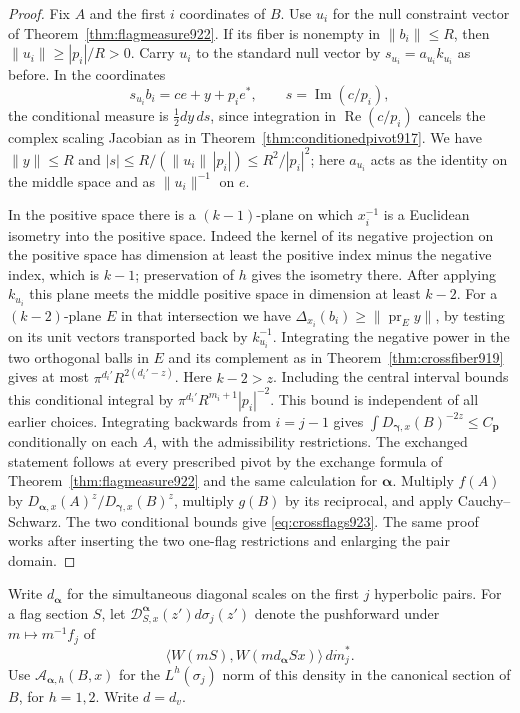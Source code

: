 \documentclass[a4paper,11pt]{article}
\theoremstyle{definition}
\theoremstyle{remark}
\numberwithin{equation}{section}
\begin{document}
\begin{proof}
Fix \(A\) and the first \(i\) coordinates of \(B\). Use \(u_i\)
for the null constraint vector of Theorem~\ref{thm:flagmeasure922}.
If its fiber is nonempty in \(\|b_i\|\le R\), then
\(\|u_i\|\ge |p_i|/R>0\). Carry \(u_i\) to the standard null
vector by \(s_{u_i}=a_{u_i}k_{u_i}\) as before. In the coordinates
\[
 s_{u_i}b_i=c e+y+p_i e^*,\qquad
           s=\operatorname{Im}(c/p_i),
\]
the conditional measure is \(\tfrac12dy\,ds\), since integration
in \(\operatorname{Re}(c/p_i)\) cancels the complex scaling
Jacobian as in Theorem~\ref{thm:conditionedpivot917}. We have
\(\|y\|\le R\) and
\(|s|\le R/(\|u_i\|\,|p_i|)\le R^2/|p_i|^2\); here \(a_{u_i}\)
acts as the identity on the middle space and as
\(\|u_i\|^{-1}\) on \(e\).

In the positive space there is a \((k-1)\)-plane on which
\(x_i^{-1}\) is a Euclidean isometry into the positive space.
Indeed the kernel of its negative projection on the positive
space has dimension at least the positive index minus the
negative index, which is \(k-1\); preservation of \(h\)
gives the isometry there. After applying \(k_{u_i}\) this
plane meets the middle positive space in dimension at least
\(k-2\). For a \((k-2)\)-plane \(E\) in that intersection we
have \(\Delta_{x_i}(b_i)\ge\|\operatorname{pr}_E y\|\), by
testing on its unit vectors transported back by \(k_{u_i}^{-1}\).
Integrating the negative power in the two orthogonal balls in
\(E\) and its complement as in Theorem~\ref{thm:crossfiber919}
gives at most \(\pi^{d_i'}R^{2(d_i'-z)}\). Here \(k-2>z\).
Including the central interval bounds this conditional integral
by \(\pi^{d_i'}R^{m_i+1}|p_i|^{-2}\).
This bound is independent of all earlier choices. Integrating
backwards from \(i=j-1\) gives
\(\int D_{\boldsymbol\gamma,x}(B)^{-2z}\le C_{\mathbf p}\)
conditionally on each \(A\), with the admissibility restrictions.
The exchanged statement follows at every prescribed pivot by the
exchange formula of Theorem~\ref{thm:flagmeasure922} and the same
calculation for \(\boldsymbol\alpha\).
Multiply \(f(A)\) by \(D_{\boldsymbol\alpha,x}(A)^z/
D_{\boldsymbol\gamma,x}(B)^z\), multiply \(g(B)\) by its
reciprocal, and apply Cauchy--Schwarz. The two conditional
bounds give \eqref{eq:crossflags923}. The same proof works
after inserting the two one-flag restrictions and enlarging
the pair domain.
\end{proof}

Write \(d_{\boldsymbol\alpha}\) for the simultaneous diagonal
scales on the first \(j\) hyperbolic pairs. For a flag section
\(S\), let \(\mathcal D^{\boldsymbol\alpha}_{S,x}(z')d\sigma_j(z')\)
denote the pushforward under \(m\mapsto m^{-1}f_j\) of
\[
     \langle W(mS),W(m d_{\boldsymbol\alpha} Sx)\rangle\,d\dot m_j^* .
\]
Use \(\mathcal A_{\boldsymbol\alpha,h}(B,x)\) for the
\(L^h(\sigma_j)\) norm of this density in the canonical section
of \(B\), for \(h=1,2\). Write \(d=d_v\).
\end{document}
